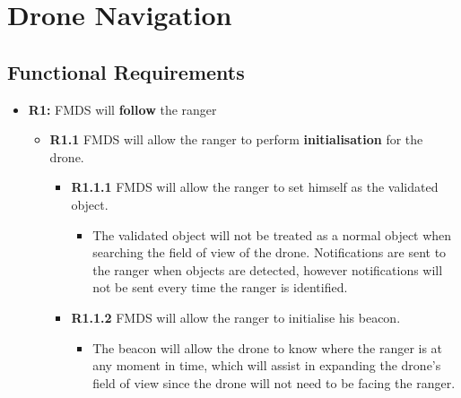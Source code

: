 \section{Drone Navigation}

\subsection{Functional Requirements}

	\begin{flushleft}
		\begin{itemize}
			\item{\textbf{R1:}} FMDS will \textbf{follow} the ranger
		  		\begin{itemize}
		  			\item{\textbf{R1.1}} FMDS will allow the ranger to perform \textbf{initialisation} for the drone.
		  				\begin{itemize}
		  					\item{\textbf{R1.1.1}} FMDS will allow the ranger to set himself as the validated object.
		  						\begin{itemize}
									\item The validated object will not be treated as a normal object when searching the field of view of the drone. Notifications are sent to the ranger when objects are detected, however notifications will not be sent every time the ranger is identified.
								\end{itemize}
		  					\item{\textbf{R1.1.2}} FMDS will allow the ranger to initialise his beacon.
								\begin{itemize}
									\item The beacon will allow the drone to know where the ranger is at any moment in time, which will assist in expanding the drone's field of view since the drone will not need to be facing the ranger.
								\end{itemize}
		  				\end{itemize}


\end{itemize}
\end{itemize}
\end{flushleft}
